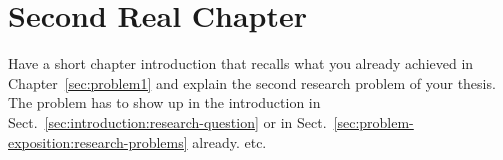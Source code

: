 \documentclass[12pt,a4paper,footinclude=true,twoside,headinclude=true]{report}
\begin{document}



\chapter{Second Real Chapter}\label{sec:sub-problem2}

Have a short chapter introduction that recalls what you already achieved in Chapter~\ref{sec:problem1} and explain the second research problem of your thesis. The problem has to show up in the introduction in Sect.~\ref{sec:introduction:research-question} or in Sect.~\ref{sec:problem-exposition:research-problems} already. etc.
\end{document}
